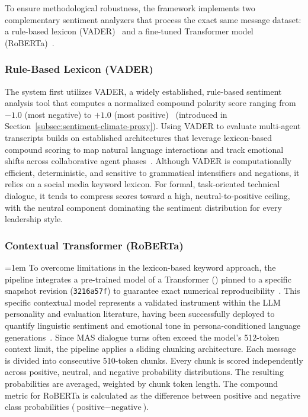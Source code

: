 To ensure methodological robustness, the framework implements two complementary sentiment analyzers that process the exact same message dataset:
a rule-based lexicon (\ac{VADER})~\cite{hutto2014vader} and a fine-tuned Transformer model (\ac{RoBERTa})~\cite{loureiro2022timelmsdiachroniclanguagemodels}.

\subsubsection{Rule-Based Lexicon (\ac{VADER})}
\label{subsubsec:vader}

The system first utilizes \ac{VADER}, a widely established, rule-based sentiment analysis tool that computes a normalized compound polarity score ranging from $-1.0$ (most negative) to $+1.0$ (most positive)~\cite{hutto2014vader} (introduced in Section~\ref{subsec:sentiment-climate-proxy}).
Using \ac{VADER} to evaluate multi-agent transcripts builds on established architectures that leverage lexicon-based compound scoring to map natural language interactions and track emotional shifts across collaborative agent phases~\cite{almutairi2025taifaautomatedfeedback}.
Although \ac{VADER} is computationally efficient, deterministic, and sensitive to grammatical intensifiers and negations, it relies on a social media keyword lexicon.
For formal, task-oriented technical dialogue, it tends to compress scores toward a high, neutral-to-positive ceiling, with the neutral component dominating the sentiment distribution for every leadership style.

\subsubsection{Contextual Transformer (\ac{RoBERTa})}
\label{subsubsec:roberta}

{
\emergencystretch=1em
To overcome limitations in the lexicon-based keyword approach, the pipeline integrates a pre-trained model of a Transformer () pinned to a specific snapshot revision (\texttt{3216a57f}) to guarantee exact numerical reproducibility~\cite{loureiro2022timelmsdiachroniclanguagemodels}.
This specific contextual model represents a validated instrument within the \ac{LLM} personality and evaluation literature, having been successfully deployed to quantify linguistic sentiment and emotional tone in persona-conditioned language generations~\cite{jiang2024personallminvestigatingabilitylarge}.
Since \ac{MAS} dialogue turns often exceed the model's 512-token context limit, the pipeline applies a sliding chunking architecture.
Each message is divided into consecutive 510-token chunks. 
Every chunk is scored independently across positive, neutral, and negative probability distributions. 
The resulting probabilities are averaged, weighted by chunk token length.
The compound metric for \ac{RoBERTa} is calculated as the difference between positive and negative class probabilities ($\text{positive} - \text{negative}$).
\par}

